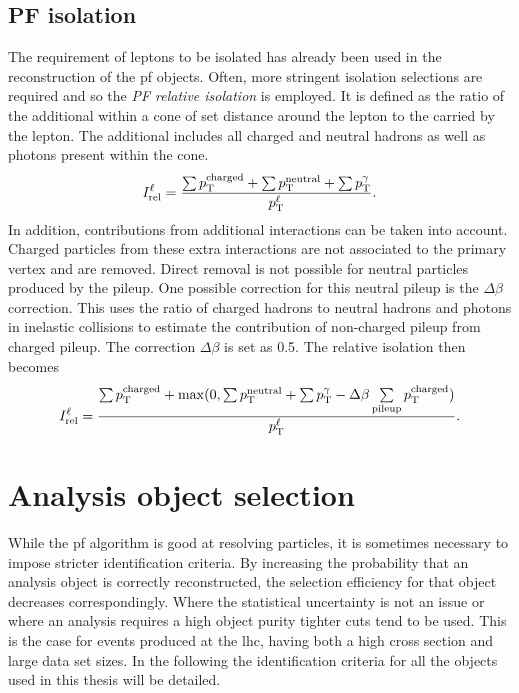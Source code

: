 \subsection{PF isolation} %
\label{sub:pf_isolation}

The requirement of leptons to be isolated has already been used in the reconstruction of the \acrshort{pf} objects.
Often, more stringent isolation selections are required and so the \textit{PF relative isolation} \Irel{} is employed.
It is defined as the ratio of the additional \pt{} within a cone of set distance around the lepton to the \pt{} carried by the lepton.
The additional \pt{} includes all charged and neutral hadrons as well as photons present within the cone.
\begin{equation}
	I_{\mathrm{rel}}^{\ell} = \frac{\sum p_{\mathrm{T}}^{\mathrm{charged}} + \sum p_{\mathrm{T}}^{\mathrm{neutral}} + \sum p_{\mathrm{T}}^{\gamma}}{p_{\mathrm{T}}^{\ell}}.
\end{equation}
In addition, contributions from additional interactions can be taken into account.
Charged particles from these extra interactions are not associated to the primary vertex and are removed.
Direct removal is not possible for neutral particles produced by the pileup.
One possible correction for this neutral pileup is the $\Delta\beta$ correction.
This uses the ratio of charged hadrons to neutral hadrons and photons in inelastic collisions to estimate the contribution of non-charged pileup from charged pileup.
The correction $\Delta\beta$ is set as 0.5.
The relative isolation then becomes
\begin{equation}
	I_{\mathrm{rel}}^{\ell} = \frac{\sum p_{\mathrm{T}}^{\mathrm{charged}} + \max(0, \sum p_{\mathrm{T}}^{\mathrm{neutral}} + \sum p_{\mathrm{T}}^{\gamma} - \Delta\beta\sum\limits^{}_{\mathrm{pileup}}p_{\mathrm{T}}^{\mathrm{charged}})}{p_{\mathrm{T}}^{\ell}}.
\end{equation}

\section{Analysis object selection}
\label{sec:analysis_objects}

While the \acrshort{pf} algorithm is good at resolving particles, it is sometimes necessary to impose stricter identification criteria.
By increasing the probability that an analysis object is correctly reconstructed, the selection efficiency for that object decreases correspondingly.
Where the statistical uncertainty is not an issue or where an analysis requires a high object purity tighter cuts tend to be used.
This is the case for \ttbar{} events produced at the \acrshort{lhc}, having both a high cross section and large data set sizes.
In the following the identification criteria for all the objects used in this thesis will be detailed.

